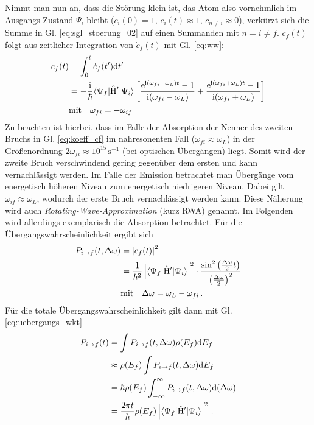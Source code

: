 Nimmt man nun an, dass die Störung klein ist, das Atom also vornehmlich im
Ausgangs-Zustand $\Psi_i$ bleibt ($c_i(0)=1$, $c_i(t)\approx 1$, $c_{n\neq
i}\approx0$), verkürzt sich die Summe in Gl. \eqref{eq:sgl_stoerung_02}
auf einen Summanden mit $n=i\neq f$. $c_f(t)$ folgt aus zeitlicher Integration von $\dot c_f(t)$ mit
Gl. \eqref{eq:ww}:
\begin{equation}\label{eq:koeff_cf}
	\begin{split}
		c_f(t) &= \int_0^t{\dot c_f(t')\mathrm{d} t'}\\
		&=
		-\frac{\mathrm{i}}{\hbar}\langle{\Psi_f}|\hat{\mathrm{H}}'|{\Psi_i}\rangle\left[\frac{\mathrm{e}^{\mathrm{i}(\omega_{fi}-\omega_L)t}-1}{\mathrm{i}(\omega_{fi}-\omega_L)}+\frac{\mathrm{e}^{\mathrm{i}(\omega_{fi}+\omega_L)t}-1}{\mathrm{i}(\omega_{fi}+\omega_L)}\right]\\
		&\text{mit}\quad
		\omega_{fi}=-\omega_{if}
	\end{split}
\end{equation}
Zu beachten ist hierbei, dass im Falle der Absorption der Nenner des zweiten
Bruchs in Gl. \eqref{eq:koeff_cf} im nahresonenten Fall
($\omega_{fi}\approx\omega_L$) in der Größenordnung $2\omega_{fi}\approx
10^{15}\,\text{s}^{-1}$ (bei optischen Übergängen) liegt. Somit wird der
zweite Bruch verschwindend gering gegenüber dem ersten und kann vernachlässigt
werden. Im Falle der Emission betrachtet man Übergänge vom energetisch höheren
Niveau zum energetisch niedrigeren Niveau. Dabei gilt
$\omega_{if}\approx\omega_L$, wodurch der erste Bruch vernachlässigt werden
kann. Diese Näherung wird auch \textit{Rotating-Wave-Approximation} (kurz RWA)
genannt. Im Folgenden wird allerdings exemplarisch die Absorption betrachtet.
Für die Übergangswahrscheinlichkeit ergibt sich
\begin{equation}\label{eq:uebergangs_wkt}
	\begin{split}
		P_{i\to f}(t,\Delta\omega) &= \left|c_f(t)\right|^2\\
		& =
		\frac{1}{\hbar^2}\left|\langle{\Psi_f}|\hat{\mathrm{H}}'|{\Psi_i}\rangle\right|^2\cdot\frac{\sin^2{\left(\frac{\Delta\omega}{2}t\right)}}{\left(\frac{\Delta\omega}{2}\right)^2}\\
		&\text{mit}\quad
		\Delta\omega=\omega_L-\omega_{fi}\,.
	\end{split}
\end{equation}
Für die totale Übergangswahrscheinlichkeit gilt dann mit Gl.
\eqref{eq:uebergangs_wkt}
\begin{equation}\label{eq:uebergangs_wkt_total}
	\begin{split}
		P_{i\to f}(t)
		&= \int{P_{i\to f}(t,\Delta\omega)\rho(E_f)}\mathrm{d} E_f\\
		&\approx \rho(E_f)\int{P_{i\to f}(t,\Delta\omega)}\mathrm{d} E_f\\
		&= \hbar\rho(E_f)\int_{-\infty}^{\infty}{P_{i\to
		f}(t,\Delta\omega)}\mathrm{d}(\Delta\omega)\\
		&= \frac{2\pi t}{\hbar}\rho(E_f)\left|\langle{\Psi_f}|\hat{\mathrm{H}}'|{\Psi_i}\rangle\right|^2\,.
	\end{split}
\end{equation}
